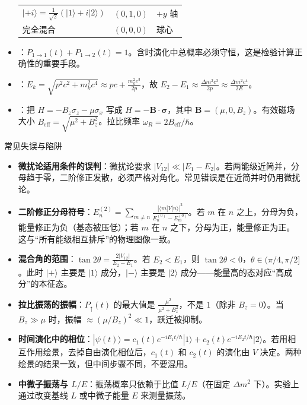 \begin{tipbox}[快速识别与解题技巧]
\begin{itemize}
\begin{center}
\begin{tabular}{lll}
    $|+i\rangle=\frac{1}{\sqrt2}(|1\rangle+i|2\rangle)$ & $(0,1,0)$ & $+y$ 轴 \\
    完全混合 & $(0,0,0)$ & 球心 \\
    \bottomrule
    \end{tabular}
    \end{center}
    \item {}：$P_{1\to1}(t)+P_{1\to2}(t)=1$。含时演化中总概率必须守恒，这是检验计算正确性的重要手段。
    \item {}：$E_k=\sqrt{p^2c^2+m_k^2c^4}\approx pc+\frac{m_k^2c^3}{2p}$，故 $E_2-E_1\approx\frac{\Delta m^2c^3}{2p}\approx\frac{\Delta m^2c^4}{2E}$。
    \item {}：把 $H=-B_z\sigma_z-\mu\sigma_x$ 写成 $H=-\mathbf{B}\cdot\boldsymbol{\sigma}$，其中 $\mathbf{B}=(\mu,0,B_z)$。有效磁场大小 $B_{\text{eff}}=\sqrt{\mu^2+B_z^2}$。拉比频率 $\omega_R=2B_{\text{eff}}/\hbar$。
\end{itemize}
\end{tipbox}

\begin{errorbox}{常见失误与陷阱}
\begin{itemize}
    \item \textbf{微扰论适用条件的误判}：微扰论要求 $|V_{12}|\ll|E_1-E_2|$。若两能级近简并，分母趋于零，二阶修正发散，必须严格对角化。常见错误是在近简并时仍用微扰论。
    \item \textbf{二阶修正分母符号}：$E_n^{(2)}=\sum_{m\neq n}\frac{|\langle m|V|n\rangle|^2}{E_n^{(0)}-E_m^{(0)}}$。若 $m$ 在 $n$ 之上，分母为负，能量修正为负（基态被压低）；若 $m$ 在 $n$ 之下，分母为正，能量修正为正。这与``所有能级相互排斥''的物理图像一致。
    \item \textbf{混合角的范围}：$\tan2\theta=\frac{2|V_{12}|}{E_2-E_1}$。若 $E_2<E_1$，则 $\tan2\theta<0$，$\theta\in(\pi/4,\pi/2]$。此时 $|+\rangle$ 主要是 $|1\rangle$ 成分，$|-\rangle$ 主要是 $|2\rangle$ 成分——能量高的态对应``高成分''的本征态。
    \item \textbf{拉比振荡的振幅}：$P_{\uparrow}(t)$ 的最大值是 $\frac{\mu^2}{\mu^2+B_z^2}$，不是 $1$（除非 $B_z=0$）。当 $B_z\gg\mu$ 时，振幅 $\approx(\mu/B_z)^2\ll1$，跃迁被抑制。
    \item \textbf{时间演化中的相位}：$|\psi(t)\rangle=c_1(t)e^{-iE_1t/\hbar}|1\rangle+c_2(t)e^{-iE_2t/\hbar}|2\rangle$。若用相互作用绘景，去掉自由演化相位后，$c_1(t)$ 和 $c_2(t)$ 的演化由 $V$ 决定。两种绘景的结果一致，但中间步骤不同，不要混用。
    \item \textbf{中微子振荡与 $L/E$}：振荡概率只依赖于比值 $L/E$（在固定 $\Delta m^2$ 下）。实验上通过改变基线 $L$ 或中微子能量 $E$ 来测量振荡。
\end{itemize}
\end{errorbox}

